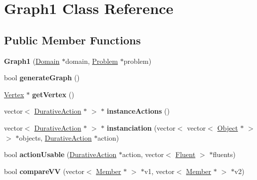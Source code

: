 \hypertarget{classGraph1}{\section{Graph1 Class Reference}
\label{classGraph1}
}
\subsection*{Public Member Functions}
\begin{DoxyCompactItemize}
\item 
\hypertarget{classGraph1_a08c7015c59cebc0d998b1b471b45057e}{{\bfseries Graph1} (\hyperlink{classDomain}{Domain} $\ast$domain, \hyperlink{classProblem}{Problem} $\ast$problem)}\label{classGraph1_a08c7015c59cebc0d998b1b471b45057e}

\item 
\hypertarget{classGraph1_aea3b26544ec74fe0ee4e3602706cc524}{bool {\bfseries generate\+Graph} ()}\label{classGraph1_aea3b26544ec74fe0ee4e3602706cc524}

\item 
\hypertarget{classGraph1_a6320d7b6c700aa29d224d560e030af11}{\hyperlink{classVertex}{Vertex} $\ast$ {\bfseries get\+Vertex} ()}\label{classGraph1_a6320d7b6c700aa29d224d560e030af11}

\item 
\hypertarget{classGraph1_aa6a21e4dc6bbbc4bfcdd5e99dc756b3c}{vector$<$ \hyperlink{classDurativeAction}{Durative\+Action} $\ast$ $>$ $\ast$ {\bfseries instance\+Actions} ()}\label{classGraph1_aa6a21e4dc6bbbc4bfcdd5e99dc756b3c}

\item 
\hypertarget{classGraph1_acd09eba0a2f3eff4c45042961e3013d7}{vector$<$ \hyperlink{classDurativeAction}{Durative\+Action} $\ast$ $>$ $\ast$ {\bfseries instanciation} (vector$<$ vector$<$ \hyperlink{classObject}{Object} $\ast$ $>$ $>$ $\ast$objects, \hyperlink{classDurativeAction}{Durative\+Action} $\ast$action)}\label{classGraph1_acd09eba0a2f3eff4c45042961e3013d7}

\item 
\hypertarget{classGraph1_ae07d27ec5d5fd9c3fb7d182a2bf24b8e}{bool {\bfseries action\+Usable} (\hyperlink{classDurativeAction}{Durative\+Action} $\ast$action, vector$<$ \hyperlink{classFluent}{Fluent} $>$ $\ast$fluents)}\label{classGraph1_ae07d27ec5d5fd9c3fb7d182a2bf24b8e}

\item 
\hypertarget{classGraph1_a513ba25f74e0c4d0c67b3273654073b5}{bool {\bfseries compare\+V\+V} (vector$<$ \hyperlink{classMember}{Member} $\ast$ $>$ $\ast$v1, vector$<$ \hyperlink{classMember}{Member} $\ast$ $>$ $\ast$v2)}\label{classGraph1_a513ba25f74e0c4d0c67b3273654073b5}


\end{DoxyCompactItemize}
